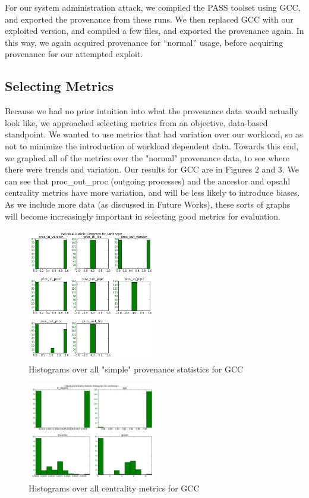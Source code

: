 \documentclass[10pt,twocolumn]{article}
\begin{document}
For our system administration attack, we compiled the PASS toolset using GCC, and exported the provenance from these runs. We then replaced GCC with our exploited version, and compiled a few files, and exported the provenance again. In this way, we again acquired provenance for “normal” usage, before acquiring provenance for our attempted exploit. 

\subsection{Selecting Metrics}
Because we had no prior intuition into what the provenance data would actually look like, we approached selecting metrics from an objective, data-based standpoint. We wanted to use metrics that had variation over our workload, so as not to minimize the introduction of workload dependent data. Towards this end, we graphed all of the metrics over the "normal" provenance data, to see where there were trends and variation. Our results for GCC are in Figures 2 and 3. We can see that proc\_out\_proc (outgoing processes) and the ancestor and opsahl centrality metrics have more variation, and will be less likely to introduce biases. As we include more data (as discussed in Future Works), these sorts of graphs will become increasingly important in selecting good metrics for evaluation.
\begin{figure}
  \caption{Histograms over all "simple" provenance statistics for GCC}
  \centering
    \includegraphics[width=0.5\textwidth]{img/gcc_stats.png}
\end{figure}
\begin{figure}
  \caption{Histograms over all centrality metrics for GCC}
  \centering
    \includegraphics[width=0.5\textwidth]{img/gcc_cent_stats.png}
\end{figure}
\end{document}
